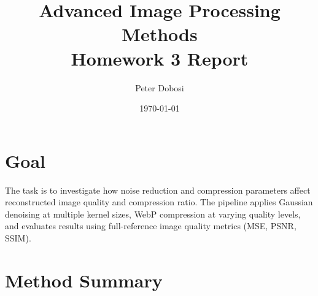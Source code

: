 \documentclass[11pt,a4paper]{article}
\title{Advanced Image Processing Methods\\Homework 3 Report}
\author{Peter Dobosi}
\date{\today}
\begin{document}
\maketitle

\section*{Goal}
The task is to investigate how noise reduction and compression parameters affect reconstructed image quality and compression ratio.
The pipeline applies Gaussian denoising at multiple kernel sizes, WebP compression at varying quality levels, and evaluates results using full-reference image quality metrics (MSE, PSNR, SSIM).

\section*{Method Summary}
\end{document}
